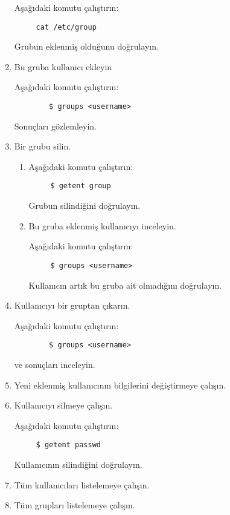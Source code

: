 \documentclass[a4paper,10pt]{article}
\begin{document}
\begin{enumerate}
     Aşağıdaki komutu çalıştırın:
\begin{verbatim}
     cat /etc/group
 \end{verbatim}
     Grubun eklenmiş olduğunu doğrulayın.

\item Bu gruba kullanıcı ekleyin

          Aşağıdaki komutu çalıştırın:
    \begin{verbatim}
        $ groups <username> 
    \end{verbatim}

        Sonuçları gözlemleyin.

\item Bir grubu silin.

\begin{enumerate}
    \item Aşağıdaki komutu çalıştırın:

\begin{verbatim}
     $ getent group
\end{verbatim} 

     Grubun silindiğini doğrulayın.

    \item Bu gruba eklenmiş kullanıcıyı inceleyin.

     Aşağıdaki komutu çalıştırın:
\begin{verbatim}
     $ groups <username>
\end{verbatim}
     Kullanıcın artık bu gruba ait olmadığını doğrulayın.
\end{enumerate}

\item Kullanıcıyı bir gruptan çıkarın.

       Aşağıdaki komutu çalıştırın:
    \begin{verbatim}
        $ groups <username> 
    \end{verbatim}
        ve sonuçları inceleyin.

\item Yeni eklenmiş kullanıcının bilgilerini değiştirmeye çalışın.

\item Kullanıcıyı silmeye çalışın.

      Aşağıdaki komutu çalıştırın:
\begin{verbatim}
     $ getent passwd
\end{verbatim}
     Kullanıcının silindiğini doğrulayın.

\item Tüm kullanıcıları listelemeye çalışın.
\item Tüm grupları listelemeye çalışın.

\end{enumerate}
\end{document}
